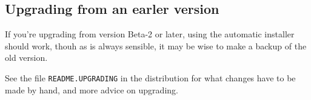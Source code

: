 \documentclass[a4paper]{article}
\begin{document}
\subsection{Upgrading from an earler version}

If you're upgrading from version Beta-2 or later, using the automatic installer should work, thouh as is always sensible, it may be wise to make a backup of the old version. 

\par See the file {\tt README.UPGRADING} in the distribution for what changes have to be made by hand, and more advice on upgrading.


\end{document}
